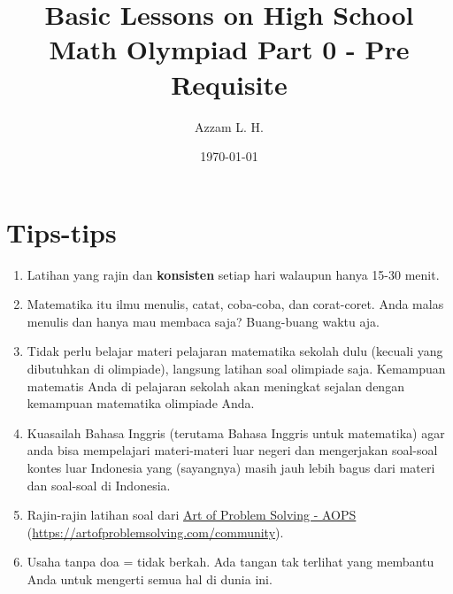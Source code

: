 \title{Basic Lessons on High School Math Olympiad Part 0 - Pre Requisite} 
\date{\today}
\author{Azzam L. H.}
\maketitle
\renewcommand*\contentsname{Daftar Isi}
\tableofcontents
 
\section{Tips-tips}
	\begin{enumerate}
	    \item Latihan yang rajin dan \textbf{konsisten} setiap hari walaupun hanya 15-30 menit.
	    \item Matematika itu ilmu menulis, catat, coba-coba, dan corat-coret. Anda malas menulis dan hanya mau membaca saja? Buang-buang waktu aja.
	    \item Tidak perlu belajar materi pelajaran matematika sekolah dulu (kecuali yang dibutuhkan di olimpiade), langsung latihan soal olimpiade saja. Kemampuan matematis Anda di pelajaran sekolah akan meningkat sejalan dengan kemampuan matematika olimpiade Anda.
	    \item Kuasailah Bahasa Inggris (terutama Bahasa Inggris untuk matematika) agar anda bisa mempelajari materi-materi luar negeri dan mengerjakan soal-soal kontes luar Indonesia yang (sayangnya) masih jauh lebih bagus dari materi dan soal-soal di Indonesia.
	    \item Rajin-rajin latihan soal dari \href{https://artofproblemsolving.com/community}{Art of Problem Solving - AOPS} (\href{https://artofproblemsolving.com/community}{https://artofproblemsolving.com/community}).
	    \item Usaha tanpa doa = tidak berkah. Ada tangan tak terlihat yang membantu Anda untuk mengerti semua hal di dunia ini.

	\end{enumerate}
	




